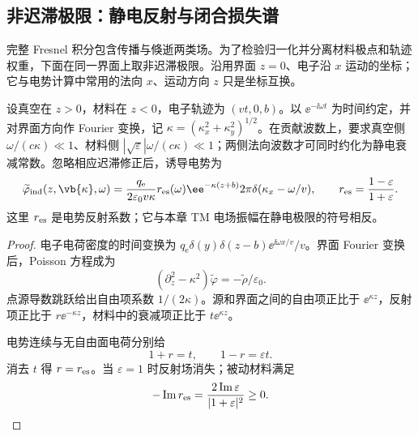 \subsection{非迟滞极限：静电反射与闭合损失谱}
\label{chap:feqo-eels}

完整 Fresnel 积分包含传播与倏逝两类场。为了检验归一化并分离材料极点和轨迹权重，下面在同一界面上取非迟滞极限。沿用界面 $z=0$、电子沿 $x$ 运动的坐标；它与电势计算中常用的法向 $x$、运动方向 $z$ 只是坐标互换。

\begin{proposition}[半空间的静电反射核]
设真空在 $z>0$，材料在 $z<0$，电子轨迹为 $(vt,0,b)$。以 $\ee^{-\ii\omega t}$ 为时间约定，并对界面方向作 Fourier 变换，记 $\kappa=(\kappa_x^2+\kappa_y^2)^{1/2}$。在贡献波数上，要求真空侧 $\omega/(c\kappa)\ll1$、材料侧 $|\sqrt\varepsilon|\omega/(c\kappa)\ll1$；两侧法向波数才可同时约化为静电衰减常数。忽略相应迟滞修正后，诱导电势为
\begin{equation}
\widetilde\varphi_{\rm ind}(z,\vb{\kappa},\omega)
=\frac{q_{\mathrm e}}{2\varepsilon_0v\kappa}
r_{\rm es}(\omega)\ee^{-\kappa(z+b)}
2\pi\delta(\kappa_x-\omega/v),
\qquad r_{\rm es}=\frac{1-\varepsilon}{1+\varepsilon}.
\label{eq:feqo-planar-image-potential}
\end{equation}
这里 $r_{\rm es}$ 是电势反射系数；它与本章 TM 电场振幅在静电极限的符号相反。
\end{proposition}
\begin{proof}
电子电荷密度的时间变换为 $q_{\mathrm e}\delta(y)\delta(z-b)\ee^{\ii\omega x/v}/v$。界面 Fourier 变换后，Poisson 方程成为
\[
(\partial_z^2-\kappa^2)\widetilde\varphi=-\widetilde\rho/\varepsilon_0.
\]
点源导数跳跃给出自由项系数 $1/(2\kappa)$。源和界面之间的自由项正比于 $\ee^{\kappa z}$，反射项正比于 $r\ee^{-\kappa z}$，材料中的衰减项正比于 $t\ee^{\kappa z}$。

电势连续与无自由面电荷分别给
\[
1+r=t,\qquad 1-r=\varepsilon t.
\]
消去 $t$ 得 $r=r_{\rm es}$。当 $\varepsilon=1$ 时反射场消失；被动材料满足
\[
-\operatorname{Im}r_{\rm es}
=\frac{2\operatorname{Im}\varepsilon}{|1+\varepsilon|^2}\ge0.
\]
\end{proof}

